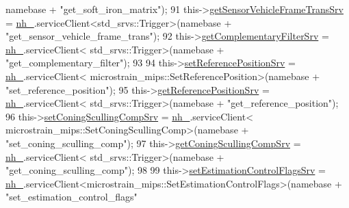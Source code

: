 \begin{DoxyCode}
      namebase + \textcolor{stringliteral}{"get\_soft\_iron\_matrix"});
91                 this->\hyperlink{classcl__microstrain__mips__client_1_1ClMicrostainMips_abfc167ed3141a0253dac8258f5092b6f}{getSensorVehicleFrameTransSrv} = 
      \hyperlink{classcl__microstrain__mips__client_1_1ClMicrostainMips_a0892aa9866da5689621b8d4793661360}{nh\_}.serviceClient<std\_srvs::Trigger>(namebase + \textcolor{stringliteral}{"get\_sensor\_vehicle\_frame\_trans"});
92                 this->\hyperlink{classcl__microstrain__mips__client_1_1ClMicrostainMips_a0dce6daea65bfc730496c95025cbc403}{getComplementaryFilterSrv} = \hyperlink{classcl__microstrain__mips__client_1_1ClMicrostainMips_a0892aa9866da5689621b8d4793661360}{nh\_}.serviceClient<
      std\_srvs::Trigger>(namebase + \textcolor{stringliteral}{"get\_complementary\_filter"});
93 
94                 this->\hyperlink{classcl__microstrain__mips__client_1_1ClMicrostainMips_ada68e40ee78a5182c1f6b7d4eea82442}{setReferencePositionSrv} = \hyperlink{classcl__microstrain__mips__client_1_1ClMicrostainMips_a0892aa9866da5689621b8d4793661360}{nh\_}.serviceClient<
      microstrain\_mips::SetReferencePosition>(namebase + \textcolor{stringliteral}{"set\_reference\_position"});
95                 this->\hyperlink{classcl__microstrain__mips__client_1_1ClMicrostainMips_ab26c6d6bc20f6816761d7d2166bcf5e7}{getReferencePositionSrv} = \hyperlink{classcl__microstrain__mips__client_1_1ClMicrostainMips_a0892aa9866da5689621b8d4793661360}{nh\_}.serviceClient<
      std\_srvs::Trigger>(namebase + \textcolor{stringliteral}{"get\_reference\_position"});
96                 this->\hyperlink{classcl__microstrain__mips__client_1_1ClMicrostainMips_a213636f3a6b6274751a60a13a5fa3a97}{setConingScullingCompSrv} = \hyperlink{classcl__microstrain__mips__client_1_1ClMicrostainMips_a0892aa9866da5689621b8d4793661360}{nh\_}.serviceClient<
      microstrain\_mips::SetConingScullingComp>(namebase + \textcolor{stringliteral}{"set\_coning\_sculling\_comp"});
97                 this->\hyperlink{classcl__microstrain__mips__client_1_1ClMicrostainMips_a55089b40c0c56c4d3186f84c1f5fb5ad}{getConingScullingCompSrv} = \hyperlink{classcl__microstrain__mips__client_1_1ClMicrostainMips_a0892aa9866da5689621b8d4793661360}{nh\_}.serviceClient<
      std\_srvs::Trigger>(namebase + \textcolor{stringliteral}{"get\_coning\_sculling\_comp"});
98 
99                 this->\hyperlink{classcl__microstrain__mips__client_1_1ClMicrostainMips_a1b440add6a87fd740f5b8f5bbf00fb03}{setEstimationControlFlagsSrv} = 
      \hyperlink{classcl__microstrain__mips__client_1_1ClMicrostainMips_a0892aa9866da5689621b8d4793661360}{nh\_}.serviceClient<microstrain\_mips::SetEstimationControlFlags>(namebase + \textcolor{stringliteral}{"set\_estimation\_control\_flags"}

\end{DoxyCode}

